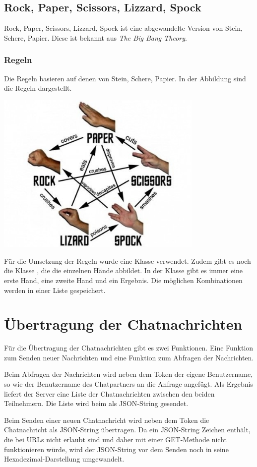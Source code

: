 \subsection{Rock, Paper, Scissors, Lizzard, Spock}
Rock, Paper, Scissors, Lizzard, Spock ist eine abgewandelte Version von Stein, Schere, Papier. Diese ist bekannt aus \textit{The Big Bang Theory}. 

\subsubsection{Regeln}
Die Regeln basieren auf denen von Stein, Schere, Papier. In der Abbildung sind die Regeln dargestellt.

\begin{capfigure}
	\includegraphics[width=10cm]{images/rpssl_rules}
\end{capfigure}

Für die Umsetzung der Regeln wurde eine Klasse  verwendet. Zudem gibt es noch die Klasse , die die einzelnen Hände abbildet. In der Klasse  gibt es immer eine erste Hand, eine zweite Hand und ein Ergebnis. Die möglichen Kombinationen werden in einer Liste gespeichert.

\section{Übertragung der Chatnachrichten}
Für die Übertragung der Chatnachrichten gibt es zwei Funktionen. Eine Funktion zum Senden neuer Nachrichten und eine Funktion zum Abfragen der Nachrichten.

Beim Abfragen der Nachrichten wird neben dem Token der eigene Benutzername, so wie der Benutzername des Chatpartners an die Anfrage angefügt. Als Ergebnis liefert der Server eine Liste der Chatnachrichten zwischen den beiden Teilnehmern. Die Liste wird beim  als JSON-String gesendet.

Beim Senden einer neuen Chatnachricht wird neben dem Token die Chatnachricht als JSON-String übertragen. Da ein JSON-String Zeichen enthält, die bei URLs nicht erlaubt sind und daher mit einer GET-Methode nicht funktionieren würde, wird der JSON-String vor dem Senden noch in seine Hexadezimal-Darstellung umgewandelt.